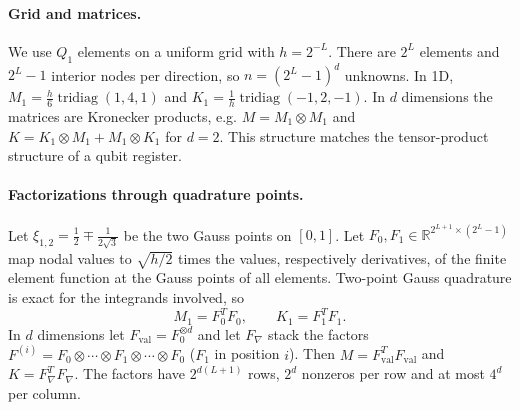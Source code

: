 \documentclass[11pt,a4paper]{article}
\newcommand{\R}{\mathbb{R}}
\theoremstyle{remark}
\begin{document}
\paragraph{Grid and matrices.} We use $Q_1$ elements on a uniform grid with
$h=2^{-L}$. There are $2^L$ elements and $2^L-1$ interior nodes per direction,
so $n=(2^L-1)^d$ unknowns. In 1D,
$M_1=\frac h6\operatorname{tridiag}(1,4,1)$ and $K_1=\frac1h\operatorname{tridiag}(-1,2,-1)$. In $d$
dimensions the matrices are Kronecker products, e.g.
$M=M_1\otimes M_1$ and $K=K_1\otimes M_1+M_1\otimes K_1$ for $d=2$. This structure matches the
tensor-product structure of a qubit register.

\paragraph{Factorizations through quadrature points.} Let $\xi_{1,2}=\frac12\mp\frac1{2\sqrt3}$
be the two Gauss points on $[0,1]$. Let $F_0,F_1\in\R^{2^{L+1}\times(2^L-1)}$ map nodal
values to $\sqrt{h/2}$ times the values, respectively derivatives, of the finite
element function at the Gauss points of all elements. Two-point Gauss
quadrature is exact for the integrands involved, so
\begin{equation}\label{eq:fact1d}
M_1=F_0^TF_0,\qquad K_1=F_1^TF_1 .
\end{equation}
In $d$ dimensions let $F_{\mathrm{val}}=F_0^{\otimes d}$ and let $F_\nabla$ stack the factors
$F^{(i)}=F_0\otimes\cdots\otimes F_1\otimes\cdots\otimes F_0$ ($F_1$ in position $i$). Then
$M=F_{\mathrm{val}}^TF_{\mathrm{val}}$ and $K=F_\nabla^TF_\nabla$. The factors have
$2^{d(L+1)}$ rows, $2^d$ nonzeros per row and at most $4^d$ per column.
\end{document}
